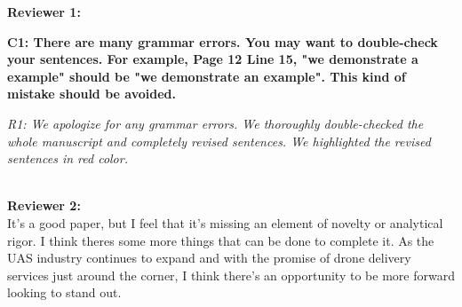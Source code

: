 \documentclass[onecolumn]{IEEEconf}
\begin{document}
\textbf{\large Reviewer 1:}\\
\begin{description}
    \item \textbf
	{
	C1: There are many grammar errors. You may want to double-check your sentences. For example,  Page 12 Line 15, "we demonstrate a example" should be "we demonstrate an example". This kind of mistake should be avoided. 
	}
	\item \textit
	{
	R1: We apologize for any grammar errors. We thoroughly double-checked the whole manuscript and completely revised sentences. We highlighted the revised sentences in red color.
	}
	~\\
    ~\\
\end{description}

\textbf{\large Reviewer 2:}\\
It's a good paper, but I feel that it's missing an element of novelty or analytical rigor.  I think theres some more things that can be done to complete it.
As the UAS industry continues to expand and with the promise of drone delivery services just around the corner, I think there's an opportunity to be more forward looking to stand out.
\end{document}
